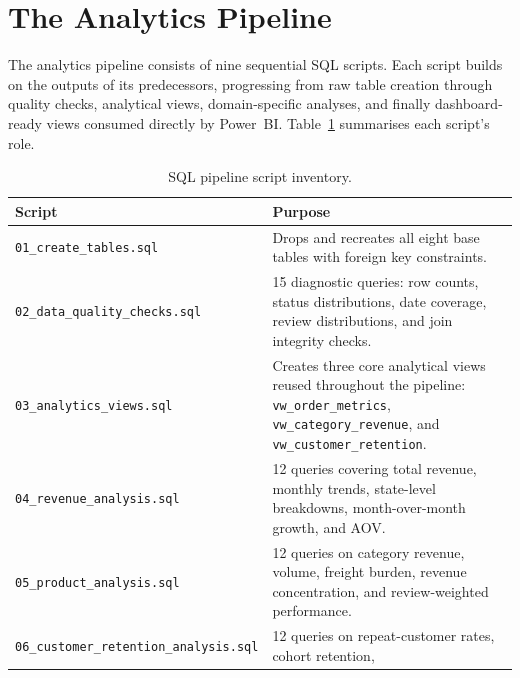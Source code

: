 \documentclass[12pt,a4paper]{article}
\begin{document}
\section{The Analytics Pipeline}
\label{sec:pipeline}

The analytics pipeline consists of nine sequential SQL scripts. Each script builds on the
outputs of its predecessors, progressing from raw table creation through quality checks,
analytical views, domain-specific analyses, and finally dashboard-ready views consumed
directly by Power~BI. Table~\ref{tab:scripts} summarises each script's role.

\begin{table}[H]
    \centering
    \caption{SQL pipeline script inventory.}
    \label{tab:scripts}
    \begin{tabular}{lp{9.5cm}}
        \toprule
        \textbf{Script} & \textbf{Purpose} \\
        \midrule
        \texttt{01\_create\_tables.sql}           & Drops and recreates all eight base tables with
                                                     foreign key constraints. \\
        \texttt{02\_data\_quality\_checks.sql}    & 15 diagnostic queries: row counts, status distributions,
                                                     date coverage, review distributions, and join integrity checks. \\
        \texttt{03\_analytics\_views.sql}         & Creates three core analytical views reused throughout the pipeline:
                                                     \texttt{vw\_order\_metrics}, \texttt{vw\_category\_revenue},
                                                     and \texttt{vw\_customer\_retention}. \\
        \texttt{04\_revenue\_analysis.sql}        & 12 queries covering total revenue, monthly trends, state-level
                                                     breakdowns, month-over-month growth, and AOV. \\
        \texttt{05\_product\_analysis.sql}        & 12 queries on category revenue, volume, freight burden,
                                                     revenue concentration, and review-weighted performance. \\
        \texttt{06\_customer\_retention\_analysis.sql} & 12 queries on repeat-customer rates, cohort retention,

\end{tabular}
\end{table}
\end{document}
